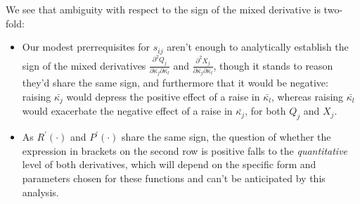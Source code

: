 \documentclass{article}
\begin{document}
We see that ambiguity with respect to the sign of the mixed derivative is two-fold:
\begin{itemize}
    \item Our modest prerrequisites for $s_{ij}$ aren't enough to analytically establish the sign of the mixed derivatives $\frac{\partial^2 Q_{j}}{\partial\bar{\kappa_{j}} \partial\bar{\kappa_{l}}}$ and $\frac{\partial^2 X_{j}}{\partial\bar{\kappa_{j}} \partial\bar{\kappa_{l}}}$, though it stands to reason they'd share the same sign, and furthermore that it would be negative: raising $\bar{\kappa_{j}}$ would depress the positive effect of a raise in $\bar{\kappa_{l}}$, whereas raising $\bar{\kappa_{l}}$ would exacerbate the negative effect of a raise in $\bar{\kappa_{j}}$, for both $Q_j$ and $X_j$.
    
    \item As $R^{\prime} (\cdot)$ and $P^{\prime} (\cdot)$ share the same sign, the question of whether the expression in brackets on the second row is positive falls to the \textit{quantitative} level of both derivatives, which will depend on the specific form and parameters chosen for these functions and can't be anticipated by this analysis.
\end{itemize}
\end{document}
